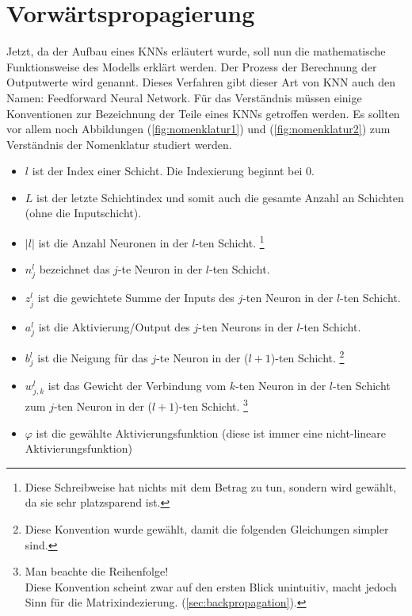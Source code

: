 \section{Vorwärtspropagierung}\label{sec:forward}
Jetzt, da der Aufbau eines KNNs erläutert wurde, soll nun die mathematische Funktionsweise
des Modells erklärt werden. Der Prozess der Berechnung der Outputwerte wird
 genannt. Dieses Verfahren gibt dieser Art von KNN auch den
Namen: Feedforward Neural Network. Für das Verständnis müssen einige Konventionen zur
Bezeichnung der Teile eines KNNs getroffen werden. Es sollten vor allem noch
Abbildungen (\ref{fig:nomenklatur1}) und (\ref{fig:nomenklatur2}) zum
Verständnis der Nomenklatur studiert werden.
\begin{itemize}
\item{$l$ ist der Index einer Schicht. Die Indexierung beginnt bei 0.}
\item{$L$ ist der letzte Schichtindex und somit auch die gesamte Anzahl an
    Schichten (ohne die Inputschicht).}
\item{$|l|$ ist die Anzahl Neuronen in der $l$-ten Schicht.
    \footnote{
      Diese Schreibweise hat nichts mit dem Betrag zu tun, sondern wird
      gewählt, da sie sehr platzsparend ist.
    }
  }
\item{$n_j^l$ bezeichnet das $j$-te Neuron in der $l$-ten Schicht.}
\item{$z_j^l$ ist die gewichtete Summe der Inputs des $j$-ten Neuron in der $l$-ten Schicht.}
\item{$a_j^l$ ist die Aktivierung/Output des $j$-ten Neurons in der $l$-ten Schicht.}
\item{$b_j^l$ ist die Neigung für das $j$-te Neuron in der ($l+1$)-ten Schicht.
    \footnote{
      Diese Konvention wurde gewählt, damit die folgenden Gleichungen simpler sind.
    }
  }
\item{$w_{j,k}^l$ ist das Gewicht der Verbindung vom $k$-ten Neuron
    in der $l$-ten Schicht zum $j$-ten Neuron in der ($l+1$)-ten Schicht.
    \footnote{
      Man beachte die Reihenfolge!\\
      Diese Konvention scheint zwar auf den ersten Blick unintuitiv, macht jedoch
      Sinn für die Matrixindezierung.
      (\ref{sec:backpropagation}).
    }
  }
\item{$\varphi$ ist die gewählte Aktivierungsfunktion (diese ist immer eine
    nicht-lineare Aktivierungsfunktion)}
\end{itemize}

